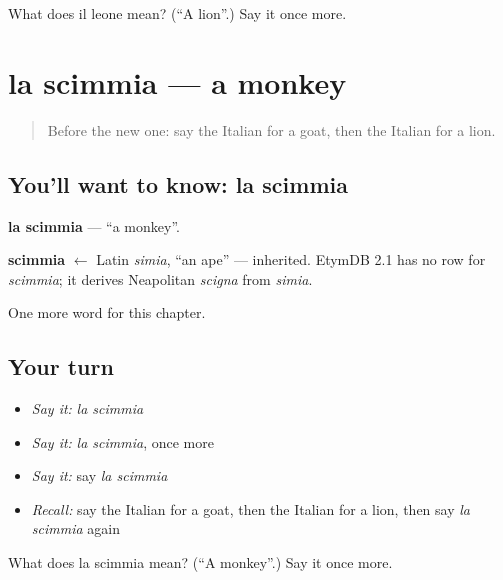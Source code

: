 \begin{tcolorbox}[breakable,colback=teal!4,colframe=teal!35!black,title={Before you move on}]
What does il leone mean? (\textquotedblleft{}A lion\textquotedblright{}.) Say it once more.
\end{tcolorbox}
\section[la scimmia]{la scimmia — a monkey}

\label{lesson:IT-C71-scimmia}



\begin{quote}
Before the new one: say the Italian for a goat, then the Italian for a lion.
\end{quote}

\subsection*{You'll want to know: la scimmia}
\textbf{la scimmia} — \textquotedblleft{}a monkey\textquotedblright{}.

\begin{cousinweb}
\textbf{scimmia} $\leftarrow$ Latin \emph{simia}, \textquotedblleft{}an ape\textquotedblright{} — inherited. EtymDB 2.1 has no row for \emph{scimmia}; it derives Neapolitan \emph{scigna} from \emph{simia}.
\end{cousinweb}

\begin{grammarlens}[title={What you've built}]
One more word for this chapter.
\end{grammarlens}

\subsection*{Your turn}
\begin{itemize}
\raggedright
  \item \emph{Say it:} \emph{la scimmia}
  \item \emph{Say it:} \emph{la scimmia}, once more
  \item \emph{Say it:} say \emph{la scimmia}
  \item \emph{Recall:} say the Italian for a goat, then the Italian for a lion, then say \emph{la scimmia} again
\end{itemize}

\begin{tcolorbox}[breakable,colback=teal!4,colframe=teal!35!black,title={Before you move on}]
What does la scimmia mean? (\textquotedblleft{}A monkey\textquotedblright{}.) Say it once more.
\end{tcolorbox}
